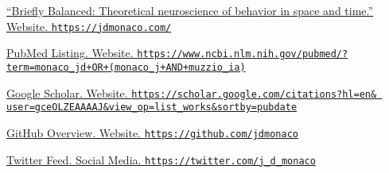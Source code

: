 \documentclass[10pt]{article}
\newcommand{\itemtitle}[1]{{\color{hopkinsblue}\ul{#1}}}
\newcommand{\aurl}[1]{{\color{dimgray}\texttt{#1}}}
\begin{document}
\begin{description}
  \item \href{https://jdmonaco.com/}
    {``\itemtitle{Briefly Balanced: Theoretical neuroscience of behavior in
    space and time}.'' Website. \aurl{https://jdmonaco.com/}}
  \item \href{https://www.ncbi.nlm.nih.gov/pubmed/?term=monaco_jd+OR+(monaco_j+AND+muzzio_ia)}
    {\itemtitle{PubMed Listing}. Website.
      \aurl{https://www.ncbi.nlm.nih.gov/pubmed/?term=monaco\_jd+OR+(monaco\_j+AND+muzzio\_ia)}}
  \item \href{https://jdmonaco.com/google-scholar}
    {\itemtitle{Google Scholar}. Website. \aurl{https://scholar.google.com/citations?hl=en\& user=gceOLZEAAAAJ\&view\_op=list\_works\&sortby=pubdate}}
  \item \href{https://github.com/jdmonaco}
    {\itemtitle{GitHub Overview}. Website. \aurl{https://github.com/jdmonaco}}
  \item \href{https://twitter.com/j_d_monaco}
    {\itemtitle{Twitter Feed}. Social Media. \aurl{https://twitter.com/j\_d\_monaco}}
\end{description}
\end{document}
